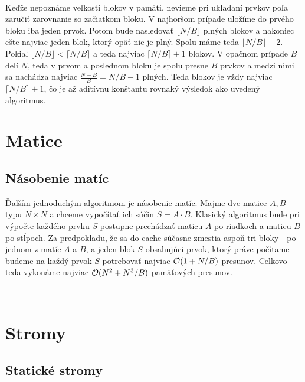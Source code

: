 \

Keďže nepoznáme veľkosti blokov v pamäti, nevieme pri ukladaní prvkov poľa zaručiť zarovnanie so začiatkom bloku. V najhoršom prípade uložíme do prvého bloku iba jeden prvok. Potom bude nasledovať $\lfloor N/B \rfloor$ plných blokov a nakoniec ešte najviac jeden blok, ktorý opäť nie je plný. Spolu máme teda $\lfloor N/B \rfloor + 2$. Pokiaľ $\lfloor N/B \rfloor < \lceil N/B \rceil$ a teda najviac $\lceil N/B \rceil + 1$ blokov. V opačnom prípade $B$ delí $N$, teda v prvom a poslednom bloku je spolu presne $B$ prvkov a medzi nimi sa nachádza najviac $\frac{N-B}{B} = N/B - 1$ plných. Teda blokov je vždy najviac $\lceil N/B \rceil +1$, čo je až aditívnu konštantu rovnaký výsledok ako uvedený \aware algoritmus.

\section{Matice}

\subsection{Násobenie matíc}

Ďalším jednoduchým \obliv algoritmom je násobenie matíc. Majme dve matice $A, B$ typu $N \times N$ a chceme vypočítať ich súčin $S = A \cdot B$. Klasický algoritmus bude pri výpočte každého prvku $S$ postupne prechádzať maticu $A$ po riadkoch a maticu $B$ po stĺpoch. Za predpokladu, že sa do cache súčasne zmestia aspoň tri bloky - po jednom z matíc $A$ a $B$, a jeden blok $S$ obsahujúci prvok, ktorý práve počítame - budeme na každý prvok $S$ potrebovať najviac $\mathcal{O}(1+N/B)$ presunov. Celkovo teda vykonáme najviac $\mathcal{O}(N^2 + N^3/B)$ pamäťových presunov. 

\



\section{Stromy}
\subsection{Statické stromy}

